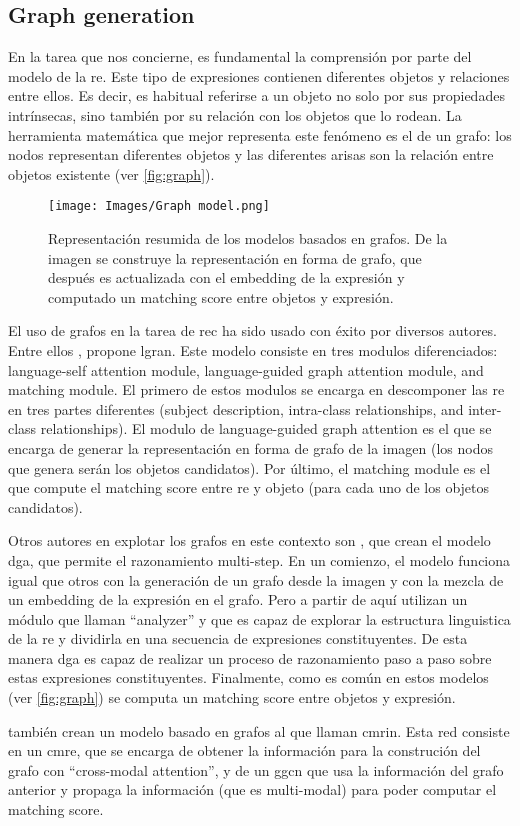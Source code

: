 \subsection{Graph generation} \label{sec:graph}
En la tarea que nos concierne, es fundamental la comprensión por parte del
modelo de la \gls{re}. Este tipo de expresiones contienen diferentes objetos y
relaciones entre ellos. Es decir, es habitual referirse a un objeto no solo por
sus propiedades intrínsecas, sino también por su relación con los objetos que
lo rodean. La herramienta matemática que mejor representa este fenómeno es el
de un grafo: los nodos representan diferentes objetos y las diferentes arisas
son la relación entre objetos existente (ver \vref{fig:graph}).

\begin{figure}[ht]
  \centering
  \texttt{[image: Images/Graph model.png]}
  \caption[Graph based model representation]{Representación resumida de los
    modelos basados en grafos. De la imagen se construye la representación en
    forma de grafo, que después es actualizada con el embedding de la expresión
    y computado un matching score entre objetos y expresión.}
  \label{fig:graph}
\end{figure}

El uso de grafos en la tarea de \gls{rec} ha sido usado con éxito por diversos
autores. Entre ellos , propone \gls{lgran}. Este modelo
consiste en tres modulos diferenciados: language-self attention module,
language-guided graph attention module, and matching module. El primero de
estos modulos se encarga en descomponer las \gls{re} en tres partes diferentes
(subject description, intra-class relationships, and inter-class
relationships). El modulo de language-guided graph attention es el que se
encarga de generar la representación en forma de grafo de la imagen (los nodos
que genera serán los objetos candidatos). Por último, el matching module es el
que compute el matching score entre \gls{re} y objeto (para cada uno de los
objetos candidatos).

Otros autores en explotar los grafos en este contexto son
, que crean el modelo \gls{dga}, que permite el
razonamiento multi-step. En un comienzo, el modelo funciona igual que otros con
la generación de un grafo desde la imagen y con la mezcla de un embedding de la
expresión en el grafo. Pero a partir de aquí utilizan un módulo que llaman
``analyzer'' y que es capaz de explorar la estructura linguistica de la
\gls{re} y dividirla en una secuencia de expresiones constituyentes. De esta
manera \gls{dga} es capaz de realizar un proceso de razonamiento paso a paso
sobre estas expresiones constituyentes. Finalmente, como es común en estos
modelos (ver \vref{fig:graph}) se computa un matching score entre objetos y
expresión.

 también crean un
modelo basado en grafos al que llaman \gls{cmrin}. Esta red consiste en un
\gls{cmre}, que se encarga de obtener la información para la construción del
grafo con ``cross-modal attention'', y de un \gls{ggcn} que usa la información
del grafo anterior y propaga la información (que es multi-modal) para poder
computar el matching score.